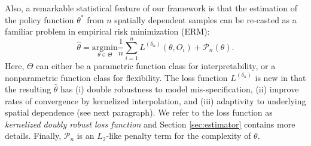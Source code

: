 \documentclass[12pt]{article}
\newcommand{\CP}[1]{{\color{purple}From Chan: #1}}
\begin{document}
Also, a remarkable statistical feature of our framework is that the estimation of the policy function $\theta^*$ from $n$ spatially dependent samples can be re-casted as a familiar problem in empirical risk minimization (ERM):
\[
\hat{\theta} = \underset{\theta  \in\Theta}{\mathrm{argmin}} \frac{1}{n} \sum_{i=1}^{n} L^{(\delta_n)}(\theta,O_i) + \mathcal{P}_n(\theta).
\]
Here, $\Theta$ can either be a parametric function class for interpretability, or a nonparametric function class for flexibility. The loss function $L^{(\delta_n)}$ is new in that the resulting $\hat{\theta}$ has (i) double robustness to model mis-specification, (ii) improve rates of convergence by kernelized interpolation, and (iii) adaptivity to underlying spatial dependence (see next paragraph). We refer to the loss function as \emph{kernelized doubly robust loss function} and Section \ref{sec:estimator} contains more details. Finally, $\mathcal{P}_n$ is an $L_2$-like penalty term for the complexity of $\theta$.



\end{document}
